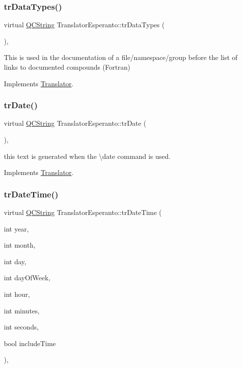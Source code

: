\subsubsection{\texorpdfstring{trDataTypes()}{trDataTypes()}}
{\footnotesize\ttfamily virtual \mbox{\hyperlink{class_q_c_string}{Q\+C\+String}} Translator\+Esperanto\+::tr\+Data\+Types (\begin{DoxyParamCaption}{ }\end{DoxyParamCaption})\hspace{0.3cm}{\ttfamily [inline]}, {\ttfamily [virtual]}}

This is used in the documentation of a file/namespace/group before the list of links to documented compounds (Fortran) 

Implements \mbox{\hyperlink{class_translator}{Translator}}.

\mbox{\label{class_translator_esperanto_aa6300cccf6a558dd119b7101c2d67dc0}} 
\subsubsection{\texorpdfstring{trDate()}{trDate()}}
{\footnotesize\ttfamily virtual \mbox{\hyperlink{class_q_c_string}{Q\+C\+String}} Translator\+Esperanto\+::tr\+Date (\begin{DoxyParamCaption}{ }\end{DoxyParamCaption})\hspace{0.3cm}{\ttfamily [inline]}, {\ttfamily [virtual]}}

this text is generated when the \textbackslash{}date command is used. 

Implements \mbox{\hyperlink{class_translator}{Translator}}.

\mbox{\label{class_translator_esperanto_ae5b7d474f4957605a820853cc5c9b93f}} 
\subsubsection{\texorpdfstring{trDateTime()}{trDateTime()}}
{\footnotesize\ttfamily virtual \mbox{\hyperlink{class_q_c_string}{Q\+C\+String}} Translator\+Esperanto\+::tr\+Date\+Time (\begin{DoxyParamCaption}\item[{int}]{year,  }\item[{int}]{month,  }\item[{int}]{day,  }\item[{int}]{day\+Of\+Week,  }\item[{int}]{hour,  }\item[{int}]{minutes,  }\item[{int}]{seconds,  }\item[{bool}]{include\+Time }\end{DoxyParamCaption})\hspace{0.3cm}{\ttfamily [inline]}, {\ttfamily [virtual]}}

